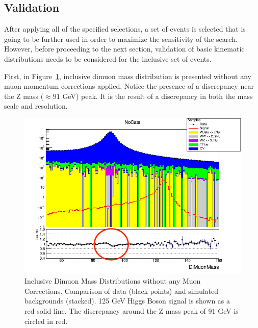 \subsection{Validation}
After applying all of the specified selections, a set of events is selected that is going to be further used in order to maximize the sensitivity of the search. However, before proceeding to the next section, validation of basic kinematic distributions needs to be considered for the inclusive set of events.

First, in Figure~\ref{fig:higgs_selections_inclusivemassnocorr}, inclusive dimuon mass distribution is presented without any muon momentum corrections applied. Notice the presence of a discrepancy near the Z mass ($\approx 91$ GeV) peak. It is the result of a discrepancy in both the mass scale and resolution.
\begin{figure}[htbp]
  \centering
  \includegraphics[width=0.5\linewidth]{figures/ch_higgs/distributions/baseline_nocorrections/distribution__NoCats__DiMuonMass__logY.png}
  \caption{Inclusive Dimuon Mass Distributions without any Muon Corrections. Comparison of data (black points) and simulated backgrounds (stacked). 125 GeV Higgs Boson signal is shown as a red solid line. The discrepancy around the Z mass peak of 91 GeV is circled in red. }
  \label{fig:higgs_selections_inclusivemassnocorr}
\end{figure}

